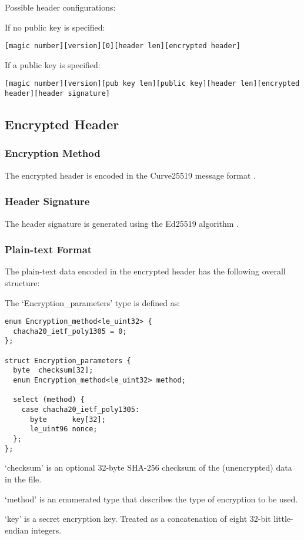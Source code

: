 \documentclass[10pt]{article}
\begin{document}
Possible header configurations:

If no public key is specified:
\begin{verbatim}
[magic number][version][0][header len][encrypted header]
\end{verbatim}

If a public key is specified:
\begin{verbatim}
[magic number][version][pub key len][public key][header len][encrypted header][header signature]
\end{verbatim}

\subsection{Encrypted Header}
\subsubsection{Encryption Method}
The encrypted header is encoded in the Curve25519 message format \cite{RFC7748}.

\subsubsection{Header Signature}
The header signature is generated using the Ed25519 algorithm \cite{RFC8032}.

\subsubsection{Plain-text Format}
The plain-text data encoded in the encrypted header has the following overall structure:

The `Encryption\_parameters' type is defined as:

\begin{verbatim}
enum Encryption_method<le_uint32> {
  chacha20_ietf_poly1305 = 0;
};

struct Encryption_parameters {
  byte	checksum[32];
  enum Encryption_method<le_uint32> method;

  select (method) {
    case chacha20_ietf_poly1305:
      byte      key[32];
      le_uint96 nonce;
  };
};
\end{verbatim}

`checksum' is an optional 32-byte SHA-256 checksum of the (unencrypted) data in the file.

`method' is an enumerated type that describes the type of encryption to be used.

`key' is a secret encryption key.
Treated as a concatenation of eight 32-bit little-endian integers.
\end{document}
